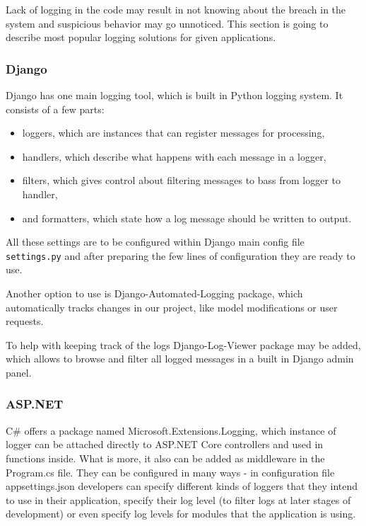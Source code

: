 Lack of logging in the code may result in not knowing about the breach in the system and suspicious behavior may go unnoticed. This section is going to describe most popular logging solutions for given applications.

\subsubsection{Django}

Django has one main logging tool, which is built in Python logging system. It consists of a few parts:
\begin{itemize}
      \item loggers, which are instances that can register messages for processing,
      \item handlers, which describe what happens with each message in a logger,
      \item filters, which gives control about filtering messages to bass from logger to handler,
      \item and formatters, which state how a log message should be written to output.
\end{itemize}
All these settings are to be configured within Django main config file \lstinline{settings.py} and after preparing the few lines of configuration they are ready to use.

Another option to use is Django-Automated-Logging package, which automatically tracks changes in our project, like model modifications or user requests.

To help with keeping track of the logs Django-Log-Viewer package may be added, which allows to browse and filter all logged messages in a built in Django admin panel.

\subsubsection{ASP.NET}

C\# offers a package named Microsoft.Extensions.Logging, which instance of logger can be attached directly to ASP.NET Core controllers and used in functions inside. What is more, it also can be added as middleware in the Program.cs file. They can be configured in many ways - in configuration file appsettings.json developers can specify different kinds of loggers that they intend to use in their application, specify their log level (to filter logs at later stages of development) or even specify log levels for modules that the application is using.

